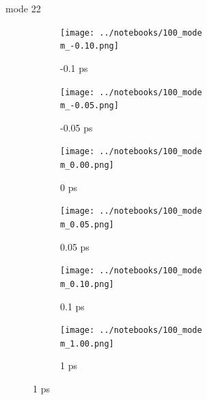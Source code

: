 \documentclass{beamer}
\begin{document}
\renewcommand\m{22}
\begin{frame}{mode \m}
	\begin{figure}
		\centering
		\begin{subfigure}[b]{\w\textwidth}
			\centering
			\texttt{[image: ../notebooks/100\_mode\\m\_-0.10.png]}
			\caption{-0.1 ps}
		\end{subfigure}
		\begin{subfigure}[b]{\w\textwidth}
			\centering
			\texttt{[image: ../notebooks/100\_mode\\m\_-0.05.png]}
			\caption{-0.05 ps}
		\end{subfigure}
		\begin{subfigure}[b]{\w\textwidth}
			\centering
			\texttt{[image: ../notebooks/100\_mode\\m\_0.00.png]}
			\caption{0 ps}
		\end{subfigure}
		\begin{subfigure}[b]{\w\textwidth}
			\centering
			\texttt{[image: ../notebooks/100\_mode\\m\_0.05.png]}
			\caption{0.05 ps}
		\end{subfigure}
		\begin{subfigure}[b]{\w\textwidth}
			\centering
			\texttt{[image: ../notebooks/100\_mode\\m\_0.10.png]}
			\caption{0.1 ps}
		\end{subfigure}
		\begin{subfigure}[b]{\w\textwidth}
			\centering
			\texttt{[image: ../notebooks/100\_mode\\m\_1.00.png]}
			\caption{1 ps}
		\end{subfigure}
	\end{figure}
\end{frame}
\end{document}
